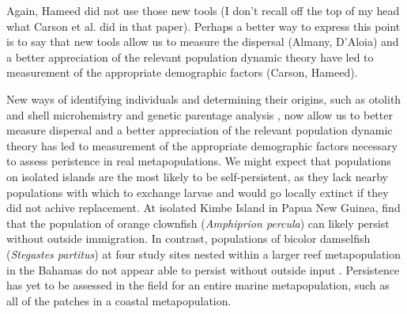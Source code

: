 \documentclass[12pt, oneside]{article}   	%
\begin{document}
Again, Hameed did not use those new tools (I don’t recall off the top of my head what Carson et al. did in that paper). Perhaps a better way to express this point is to say that new tools allow us to measure the dispersal (Almany, D’Aloia) and a better appreciation of the relevant population dynamic theory have led to measurement of the appropriate demographic factors (Carson, Hameed).

New ways of identifying individuals and determining their origins, such as otolith and shell microhemistry and genetic parentage analysis \citep[e.g.][]{wang2004sibship, wang2014estimation}, now allow us to better measure dispersal \citep[e.g.][]{almany2017larval, daloia_self-recruitment_2013} and a better appreciation of the relevant population dynamic theory has led to measurement of the appropriate demographic factors \citep[e.g.][]{carson2011evaluating, hameed2016inverse} necessary to assess peristence in real metapopulations. We might expect that populations on isolated islands are the most likely to be self-persistent, as they lack nearby populations with which to exchange larvae and would go locally extinct if they did not achive replacement. At isolated Kimbe Island in Papua New Guinea, \cite{salles_coral_2015} find that the population of orange clownfish (\textit{Amphiprion percula}) can likely persist without outside immigration. In contrast, populations of bicolor damselfish (\textit{Stegastes partitus}) at four study sites nested within a larger reef metapopulation in the Bahamas do not appear able to persist without outside input \citep{johnson2018integrating}. Persistence has yet to be assessed in the field for an entire marine metapopulation, such as all of the patches in a coastal metapopulation. 

\end{document}
